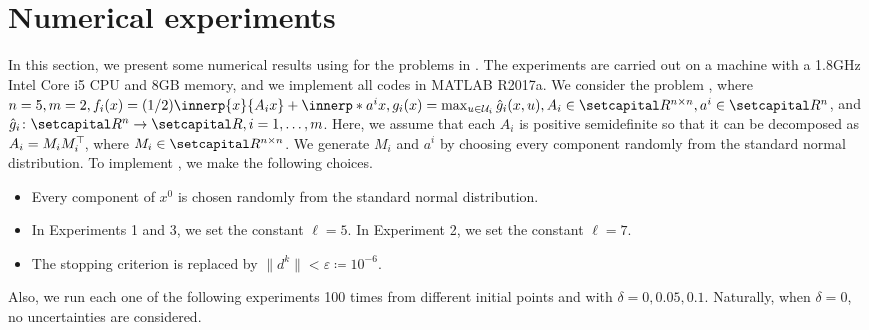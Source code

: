 \documentclass[../main]{subfiles}
\begin{document}
\section{Numerical experiments} 
In this section, we present some numerical results using  for the problems in .
The experiments are carried out on a machine with a 1.8GHz Intel Core i5 CPU and 8GB memory, and we implement all codes in MATLAB R2017a. We consider the problem , where $n = 5, m = 2, f_i(x) = (1 / 2) \innerp{x}{A_i x} + \innerp*{a^i}{x}, g_i(x) = \max_{u \in {\mathcal{U}}_i } \hat{g}_i (x,u),A_i \in \setR^{n \times n}, a^i \in \setR^n$, and $\hat{g}_i\colon \setR^n \to \setR, i = 1,\ldots, m$. 
Here, we assume that each $A_i$ is positive semidefinite so that it can be decomposed as $A_i = M_i M_i^\top\hspace{-1pt}$, where $M_i \in \setR^{n \times n}$. We generate $M_i$ and $a^i$ by choosing every component randomly from the standard normal distribution. To implement , we make the following choices.
\begin{remark}
\begin{itemize}
\item Every component of $x^0$ is chosen randomly from the standard normal distribution.
\item In Experiments 1 and 3, we set the constant $\ell = 5$. In Experiment 2, we set the constant $\ell = 7$.
\item The stopping criterion is replaced by $\|d^k\| < \varepsilon \coloneqq 10^{-6}$.
\end{itemize}
\end{remark}

Also, we run each one of the following experiments 100 times from different initial points and with $\delta = 0, 0.05, 0.1$. 
Naturally, when $\delta = 0$, no uncertainties are considered.
\end{document}
